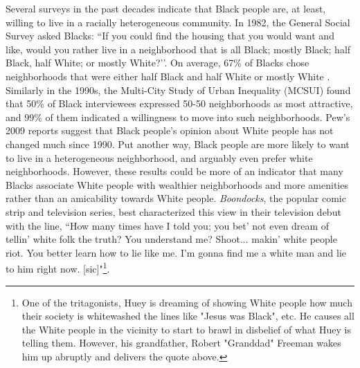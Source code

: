 \documentclass[11pt]{asaproc}
\newcommand{\1}{\mathbb{1}}
\begin{document}
Several surveys in the past decades indicate that Black people are, at least, willing to live in a racially heterogeneous community. In 1982, the General Social Survey asked Blacks: ``If you could find the housing that you would want and like, would you rather live in a neighborhood that is all Black; mostly Black; half Black, half White; or mostly White?’’. On average, 67\% of Blacks chose neighborhoods that were either half Black and half White or mostly White \citep{davis92}. Similarly in the 1990s, the Multi-City Study of Urban Inequality (MCSUI) found that 50\% of Black interviewees expressed 50-50 neighborhoods as most attractive, and 99\% of them indicated a willingness to move into such neighborhoods\citep{krysan02}. Pew's 2009 reports suggest that Black people's opinion about White people has not changed much since 1990. Put another way, Black people are more likely to want to live in a heterogeneous neighborhood, and arguably even prefer white neighborhoods. However, these results could be more of an indicator that many Blacks associate White people with wealthier neighborhoods and more amenities rather than an amicability towards White people. \textit{Boondocks}, the popular comic strip and television series,  best characterized this view in their television debut with the line, ``How many times have I told you; you bet' not even dream of tellin' white folk the truth? You understand me? Shoot... makin' white people riot. You better learn how to lie like me. I'm gonna find me a white man and lie to him right now. [sic]"\footnote{One of the tritagonists, Huey is dreaming of showing White people how much their society is whitewashed the lines like "Jesus was Black", etc. He causes all the White people in the vicinity to start to brawl in disbelief of what Huey is telling them.  However, his grandfather, Robert "Granddad" Freeman wakes him up abruptly and delivers the quote above.}\citep{mcgruder05}. 
\end{document}
